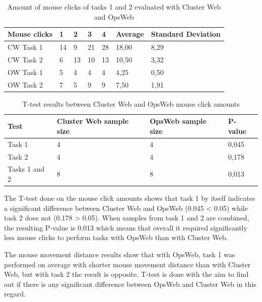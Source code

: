 \begin{table}[!ht]
\def\arraystretch{1.1}%
    \begin{center}
    \caption{Amount of mouse clicks of tasks 1 and 2 evaluated with Cluster Web and OpsWeb}
    \label{cw_ow_clicks}
    \begin{tabular}{| l | l | l | l | l | l | l | }
    \hline
    Mouse clicks & 1  & 2  & 3  & 4  & Average & Standard Deviation \\
    \hline
    CW Task 1    & 14 & 9  & 21 & 28 & 18,00   & 8,29               \\
    CW Task 2    & 6  & 13 & 10 & 13 & 10,50   & 3,32               \\
    OW Task 1    & 5  & 4  & 4  & 4  & 4,25    & 0,50               \\
    OW Task 2    & 7  & 5  & 9  & 9  & 7,50    & 1,91            \\
    \hline
    \end{tabular}
    \end{center}
\end{table}

\begin{table}[!ht]
\def\arraystretch{1.1}%
    \begin{center}
    \caption{T-test results between Cluster Web and OpsWeb mouse click amounts}
    \label{cw_ow_clicks_t_test}
    \begin{tabular}{| l | l | l | l | }
    \hline
    Test & Cluster Web sample size & OpsWeb sample size  & P-value   \\
    \hline
    Task 1 & 4 & 4 & 0,045 \\
    Task 2 & 4 & 4 & 0,178 \\
    Tasks 1 and 2 & 8 & 8 & 0,013 \\
    \hline
    \end{tabular}
    \end{center}
\end{table}

The T-test done on the mouse click amounts shows that task 1 by itself indicates a significant difference between Cluster Web and OpsWeb (0.045 < 0.05) while task 2 does not (0.178 > 0.05). When samples from task 1 and 2 are combined, the resulting P-value is 0.013 which means that overall it required significantly less mouse clicks to perform tasks with OpsWeb than with Cluster Web.

The mouse movement distance results show that with OpsWeb, task 1 was performed on average with shorter mouse movement distance than with Cluster Web, but with task 2 the result is opposite. T-test is done with the aim to find out if there is any significant difference between OpsWeb and Cluster Web in this regard.

